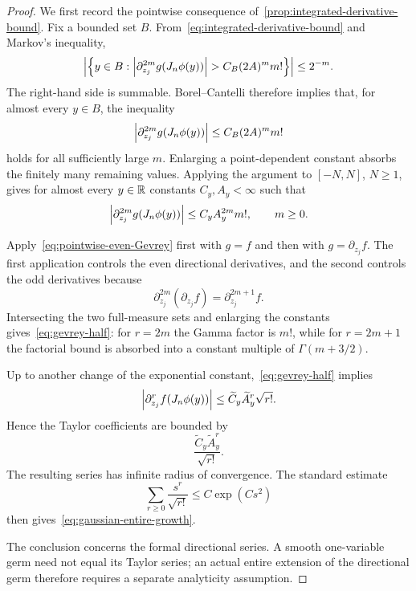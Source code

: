 \begin{proof}
We first record the pointwise consequence of~\cref{prop:integrated-derivative-bound}. Fix a bounded set $B$. From~\eqref{eq:integrated-derivative-bound} and Markov's inequality,
\begin{equation*}
  \left|\left\{
    y\in B:
    \left|\partial_{z_j}^{2m}g(J_n\phi(y))\right|
    >C_B(2A)^m m!
  \right\}\right|
  \leq
  2^{-m}.
\end{equation*}
The right-hand side is summable. Borel--Cantelli therefore implies that, for almost every $y\in B$, the inequality
\begin{equation*}
  \left|\partial_{z_j}^{2m}g(J_n\phi(y))\right|
  \leq
  C_B(2A)^m m!
\end{equation*}
holds for all sufficiently large $m$. Enlarging a point-dependent constant absorbs the finitely many remaining values. Applying the argument to $[-N,N]$, $N\geq1$, gives for almost every $y\in\mathbb R$ constants $C_y,A_y<\infty$ such that
\begin{equation}
  \left|\partial_{z_j}^{2m}g(J_n\phi(y))\right|
  \leq
  C_yA_y^{2m}m!,
  \qquad m\geq0.
  \label{eq:pointwise-even-Gevrey}
\end{equation}

Apply~\eqref{eq:pointwise-even-Gevrey} first with $g=f$ and then with $g=\partial_{z_j}f$. The first application controls the even directional derivatives, and the second controls the odd derivatives because
\begin{equation*}
  \partial_{z_j}^{2m}(\partial_{z_j}f)
  =
  \partial_{z_j}^{2m+1}f.
\end{equation*}
Intersecting the two full-measure sets and enlarging the constants gives~\eqref{eq:gevrey-half}: for $r=2m$ the Gamma factor is $m!$, while for $r=2m+1$ the factorial bound is absorbed into a constant multiple of $\Gamma(m+3/2)$.

Up to another change of the exponential constant,~\eqref{eq:gevrey-half} implies
\begin{equation*}
  \left|\partial_{z_j}^r f(J_n\phi(y))\right|
  \leq
  \widetilde C_y\widetilde A_y^r\sqrt{r!}.
\end{equation*}
Hence the Taylor coefficients are bounded by
\begin{equation*}
  \frac{\widetilde C_y\widetilde A_y^r}{\sqrt{r!}}.
\end{equation*}
The resulting series has infinite radius of convergence. The standard estimate
\begin{equation*}
  \sum_{r\geq0}\frac{s^r}{\sqrt{r!}}
  \leq
  C\exp(Cs^2)
\end{equation*}
then gives~\eqref{eq:gaussian-entire-growth}.

The conclusion concerns the formal directional series. A smooth one-variable germ need not equal its Taylor series; an actual entire extension of the directional germ therefore requires a separate analyticity assumption.
\end{proof}
